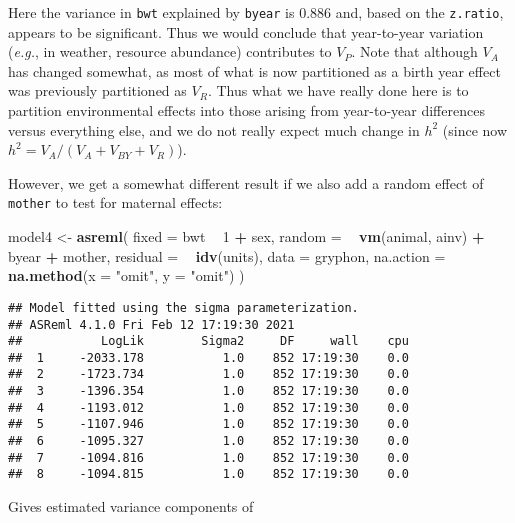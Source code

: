 \documentclass[12pt,]{book}
\newenvironment{Shaded}{\begin{snugshade}}{\end{snugshade}}
\newcommand{\DataTypeTok}[1]{\textcolor[rgb]{0.13,0.29,0.53}{#1}}
\newcommand{\DecValTok}[1]{\textcolor[rgb]{0.00,0.00,0.81}{#1}}
\newcommand{\KeywordTok}[1]{\textcolor[rgb]{0.13,0.29,0.53}{\textbf{#1}}}
\newcommand{\NormalTok}[1]{#1}
\newcommand{\OperatorTok}[1]{\textcolor[rgb]{0.81,0.36,0.00}{\textbf{#1}}}
\newcommand{\StringTok}[1]{\textcolor[rgb]{0.31,0.60,0.02}{#1}}
\begin{document}
Here the variance in \texttt{bwt} explained by \texttt{byear} is 0.886 and, based on the \texttt{z.ratio}, appears to be significant. Thus we would conclude that year-to-year variation (\emph{e.g.}, in weather, resource abundance) contributes to \(V_P\). Note that although \(V_A\) has changed somewhat, as most of what is now partitioned as a birth year effect was previously partitioned as \(V_R\). Thus what we have really done here is to partition environmental effects into those arising from year-to-year differences versus everything else, and we do not really expect much change in \(h^2\) (since now \(h^2 = V_A/ (V_A+V_{BY}+V_R)\)).

However, we get a somewhat different result if we also add a random effect of \texttt{mother} to test for maternal effects:

\begin{Shaded}
\begin{Highlighting}[]
\NormalTok{model4 <-}\StringTok{ }\KeywordTok{asreml}\NormalTok{(}
  \DataTypeTok{fixed =}\NormalTok{ bwt }\OperatorTok{~}\StringTok{ }\DecValTok{1} \OperatorTok{+}\StringTok{ }\NormalTok{sex,}
  \DataTypeTok{random =} \OperatorTok{~}\StringTok{ }\KeywordTok{vm}\NormalTok{(animal, ainv) }\OperatorTok{+}\StringTok{ }\NormalTok{byear }\OperatorTok{+}\StringTok{ }\NormalTok{mother,}
  \DataTypeTok{residual =} \OperatorTok{~}\StringTok{ }\KeywordTok{idv}\NormalTok{(units),}
  \DataTypeTok{data =}\NormalTok{ gryphon,}
  \DataTypeTok{na.action =} \KeywordTok{na.method}\NormalTok{(}\DataTypeTok{x =} \StringTok{"omit"}\NormalTok{, }\DataTypeTok{y =} \StringTok{"omit"}\NormalTok{)}
\NormalTok{)}
\end{Highlighting}
\end{Shaded}

\begin{verbatim}
## Model fitted using the sigma parameterization.
## ASReml 4.1.0 Fri Feb 12 17:19:30 2021
##           LogLik        Sigma2     DF     wall    cpu
##  1     -2033.178           1.0    852 17:19:30    0.0
##  2     -1723.734           1.0    852 17:19:30    0.0
##  3     -1396.354           1.0    852 17:19:30    0.0
##  4     -1193.012           1.0    852 17:19:30    0.0
##  5     -1107.946           1.0    852 17:19:30    0.0
##  6     -1095.327           1.0    852 17:19:30    0.0
##  7     -1094.816           1.0    852 17:19:30    0.0
##  8     -1094.815           1.0    852 17:19:30    0.0
\end{verbatim}

Gives estimated variance components of
\end{document}
